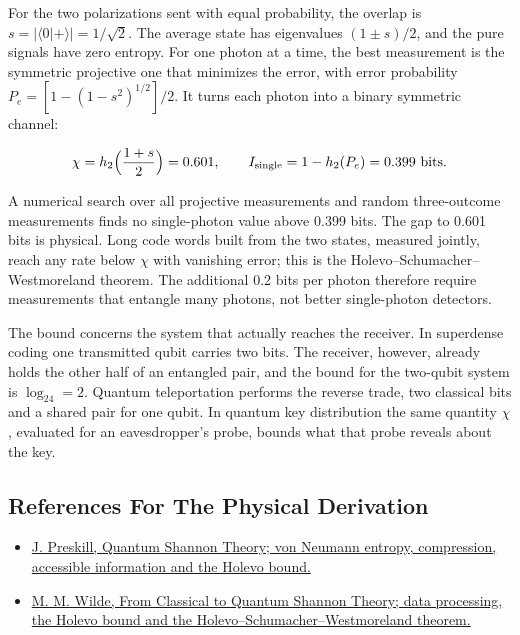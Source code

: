 \documentclass[11pt,oneside]{book}
\newenvironment{centeredalign}{\[\begin{gathered}[c]}{\end{gathered}\]}
\begin{document}
For the two polarizations sent with equal probability, the overlap is \(s=|\langle0|+\rangle|=1/\sqrt2\). The average state has eigenvalues \((1\pm s)/2\), and the pure signals have zero entropy. For one photon at a time, the best measurement is the symmetric projective one that minimizes the error, with error probability \(P_e=[1-(1-s^2)^{1/2}]/2\). It turns each photon into a binary symmetric channel:

\begin{centeredalign}
\chi=h_2\Big(\frac{1+s}{2}\Big)=0.601,\qquad
I_{\rm single}=1-h_2(P_e)=0.399\ \text{bits}.
\end{centeredalign}

A numerical search over all projective measurements and random three-outcome measurements finds no single-photon value above 0.399 bits. The gap to 0.601 bits is physical. Long code words built from the two states, measured jointly, reach any rate below \(\chi\) with vanishing error; this is the Holevo--Schumacher--Westmoreland theorem. The additional 0.2 bits per photon therefore require measurements that entangle many photons, not better single-photon detectors.

The bound concerns the system that actually reaches the receiver. In superdense coding one transmitted qubit carries two bits. The receiver, however, already holds the other half of an entangled pair, and the bound for the two-qubit system is \(\log_24=2\). Quantum teleportation performs the reverse trade, two classical bits and a shared pair for one qubit. In quantum key distribution the same quantity \(\chi\), evaluated for an eavesdropper's probe, bounds what that probe reveals about the key.

\subsection*{References For The Physical Derivation}
\begin{itemize}
\item \href{https://arxiv.org/abs/1604.07450}{J. Preskill, Quantum Shannon Theory; von Neumann entropy, compression, accessible information and the Holevo bound.}
\item \href{https://arxiv.org/abs/1106.1445}{M. M. Wilde, From Classical to Quantum Shannon Theory; data processing, the Holevo bound and the Holevo--Schumacher--Westmoreland theorem.}
\end{itemize}
\end{document}
